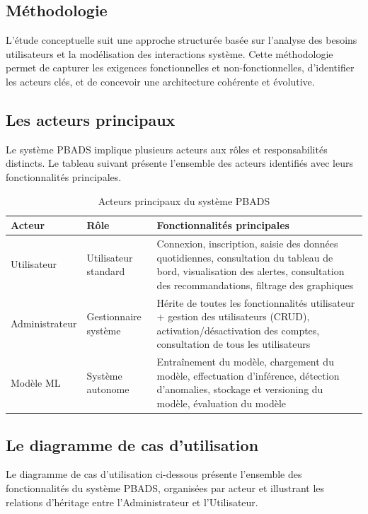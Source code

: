 \subsection{Méthodologie}

L'étude conceptuelle suit une approche structurée basée sur l'analyse des besoins utilisateurs et la modélisation des interactions système. Cette méthodologie permet de capturer les exigences fonctionnelles et non-fonctionnelles, d'identifier les acteurs clés, et de concevoir une architecture cohérente et évolutive.

\subsection{Les acteurs principaux}

Le système PBADS implique plusieurs acteurs aux rôles et responsabilités distincts. Le tableau suivant présente l'ensemble des acteurs identifiés avec leurs fonctionnalités principales.

\begin{table}[H]
\centering
\small
\renewcommand{\arraystretch}{1.3}
\begin{tabular}{|p{3cm}|p{4.5cm}|p{6.5cm}|}
\hline
\textbf{Acteur} & \textbf{Rôle} & \textbf{Fonctionnalités principales} \\
\hline
Utilisateur & Utilisateur standard & Connexion, inscription, saisie des données quotidiennes, consultation du tableau de bord, visualisation des alertes, consultation des recommandations, filtrage des graphiques \\
\hline
Administrateur & Gestionnaire système & Hérite de toutes les fonctionnalités utilisateur + gestion des utilisateurs (CRUD), activation/désactivation des comptes, consultation de tous les utilisateurs \\
\hline
Modèle ML & Système autonome & Entraînement du modèle, chargement du modèle, effectuation d'inférence, détection d'anomalies, stockage et versioning du modèle, évaluation du modèle \\
\hline
\end{tabular}
\caption{Acteurs principaux du système PBADS}
\label{tab:acteurs_principaux}
\end{table}

\subsection{Le diagramme de cas d'utilisation}

Le diagramme de cas d'utilisation ci-dessous présente l'ensemble des fonctionnalités du système PBADS, organisées par acteur et illustrant les relations d'héritage entre l'Administrateur et l'Utilisateur.

